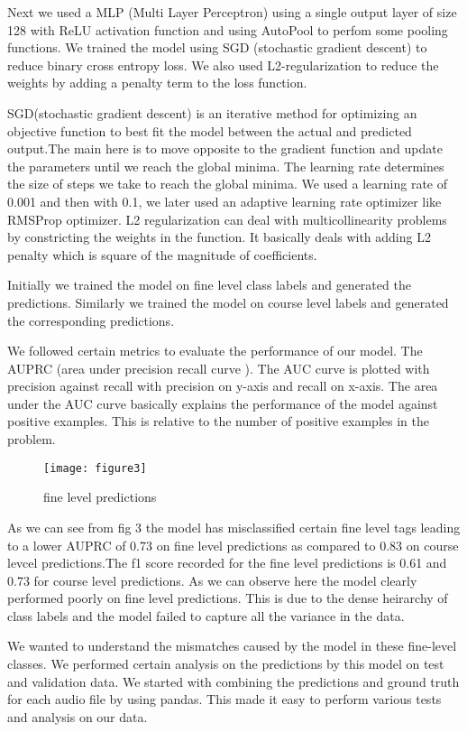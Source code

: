     Next we used a MLP (Multi Layer Perceptron) using a single output layer of size 128 with ReLU activation function and using AutoPool to perfom some pooling functions. We trained the model using SGD (stochastic gradient descent) to reduce binary cross entropy loss. We also used L2-regularization to reduce the weights by adding a penalty term to the loss function.
    
    SGD(stochastic gradient descent) is an iterative method for optimizing an objective function to best fit the model between the actual and predicted output.The main here is to move opposite to the gradient function and update the parameters until we reach the global minima. The learning rate determines the size of steps we take to reach the global minima. We used a learning rate of 0.001 and then with 0.1, we later used an adaptive learning rate optimizer like RMSProp optimizer.
    L2 regularization can deal with multicollinearity problems by constricting the weights in the function. It basically deals with adding L2 penalty which is square of the magnitude of coefficients.
    
    Initially we trained the model on fine level class labels and generated the predictions. Similarly we trained the model on course level labels and generated the corresponding predictions. 
    
    We followed certain metrics to evaluate the performance of our model. The AUPRC (area under precision recall curve ). The AUC curve is plotted with precision against recall with precision on y-axis and recall on x-axis. The area under the AUC curve basically explains the performance of the model against positive examples. This is relative to the number of positive examples in the problem.
    	\begin{figure}[h!]
    	\texttt{[image: figure3]}
    	\caption{fine level predictions}
    \end{figure}
   
    
    As we can see from fig 3 the model has misclassified certain fine level tags leading to a lower AUPRC of 0.73 on fine level predictions as compared to 0.83 on course levcel predictions.The f1 score recorded for the fine level predictions is 0.61 and 0.73 for course level predictions. As we can observe here the model clearly performed poorly on fine level predictions. This is due to the dense heirarchy of class labels and the model failed to capture all the variance in the data.
    
    We wanted to understand the mismatches caused by the model in these fine-level classes. We performed certain analysis on the predictions by this model on test and validation data. We started with combining the predictions and ground truth for each audio file by using pandas. This made it easy to perform various tests and analysis on our data.
    
